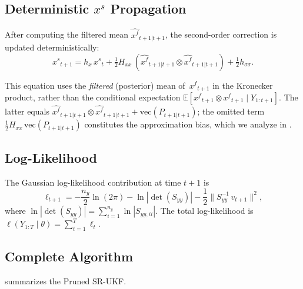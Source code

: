 \documentclass[12pt,a4paper]{article}
\newcommand{\E}{\mathbb{E}}
\newcommand{\vect}{\mathrm{vec}}
\newcommand{\kron}{\otimes}
\newcommand{\xf}{{x^{f}}}
\newcommand{\xs}{{x^{s}}}
\newcommand{\hx}{h_x}
\newcommand{\Hxx}{H_{xx}}
\newcommand{\hsig}{{h_{\sigma\sigma}}}
\begin{document}
\subsection{Deterministic $\xs$ Propagation}\label{sec:xs-update}

After computing the filtered mean $\hat{\xf}_{t+1|t+1}$, the
second-order correction is updated deterministically:
\begin{equation}\label{eq:xs-update}
\xs_{t+1} = \hx\,\xs_t
  + \tfrac{1}{2}\Hxx\,
    (\hat{\xf}_{t+1|t+1} \kron \hat{\xf}_{t+1|t+1})
  + \tfrac{1}{2}\hsig.
\end{equation}

This equation uses the \emph{filtered} (posterior) mean of~$\xf_{t+1}$
in the Kronecker product, rather than the conditional expectation
$\E[\xf_{t+1} \kron \xf_{t+1} \mid Y_{1:t+1}]$. The latter equals
$\hat{\xf}_{t+1|t+1} \kron \hat{\xf}_{t+1|t+1}
+ \vect(P_{t+1|t+1})$;
the omitted term $\tfrac{1}{2}\Hxx\,\vect(P_{t+1|t+1})$ constitutes
the approximation bias, which we analyze in .

\subsection{Log-Likelihood}\label{sec:loglik}

The Gaussian log-likelihood contribution at time $t+1$ is
\begin{equation}\label{eq:loglik}
\ell_{t+1} = -\frac{n_y}{2}\ln(2\pi)
  - \ln|\det(S_{yy})|
  - \frac{1}{2}\|S_{yy}^{-1}\,v_{t+1}\|^2,
\end{equation}
where $\ln|\det(S_{yy})| = \sum_{i=1}^{n_y} \ln|S_{yy,ii}|$. The
total log-likelihood is
$\ell(Y_{1:T} \mid \theta) = \sum_{t=1}^{T} \ell_t$.

\subsection{Complete Algorithm}

 summarizes the Pruned SR-UKF.
\end{document}

